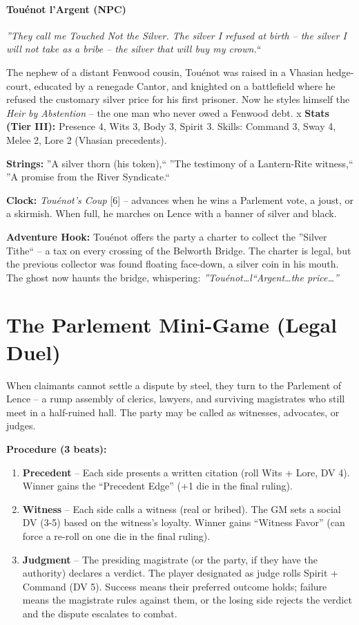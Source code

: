 \documentclass[11pt,twoside]{book}
\begin{document}
\paragraph{Touénot l'Argent (NPC)}
\textit{''They call me Touched Not the Silver. The silver I refused at birth -- the silver I will not take as a bribe -- the silver that will buy my crown.``}

The nephew of a distant Fenwood cousin, Touénot was raised in a Vhasian hedge-court, educated by a renegade Cantor, and knighted on a battlefield where he refused the customary silver price for his first prisoner. Now he styles himself the \textit{Heir by Abstention} -- the one man who never owed a Fenwood debt.
x
\textbf{Stats (Tier III):} Presence 4, Wits 3, Body 3, Spirit 3. Skills: Command 3, Sway 4, Melee 2, Lore 2 (Vhasian precedents).

\textbf{Strings:} ''A silver thorn (his token),`` ''The testimony of a Lantern-Rite witness,`` ''A promise from the River Syndicate.``

\textbf{Clock:} \textit{Touénot's Coup} [6] -- advances when he wins a Parlement vote, a joust, or a skirmish. When full, he marches on Lence with a banner of silver and black.

\textbf{Adventure Hook:} Touénot offers the party a charter to collect the ''Silver Tithe`` -- a tax on every crossing of the Belworth Bridge. The charter is legal, but the previous collector was found floating face-down, a silver coin in his mouth. The ghost now haunts the bridge, whispering: \textit{''Touénot\dots l``Argent\dots the price\dots''}

\section*{The Parlement Mini-Game (Legal Duel)}

When claimants cannot settle a dispute by steel, they turn to the Parlement of Lence -- a rump assembly of clerics, lawyers, and surviving magistrates who still meet in a half-ruined hall. The party may be called as witnesses, advocates, or judges.

\textbf{Procedure (3 beats):}

\begin{enumerate}
    \item \textbf{Precedent} -- Each side presents a written citation (roll Wits + Lore, DV 4). Winner gains the ``Precedent Edge'' (+1 die in the final ruling).
    \item \textbf{Witness} -- Each side calls a witness (real or bribed). The GM sets a social DV (3-5) based on the witness's loyalty. Winner gains ``Witness Favor'' (can force a re-roll on one die in the final ruling).
    \item \textbf{Judgment} -- The presiding magistrate (or the party, if they have the authority) declares a verdict. The player designated as judge rolls Spirit + Command (DV 5). Success means their preferred outcome holds; failure means the magistrate rules against them, or the losing side rejects the verdict and the dispute escalates to combat.
\end{enumerate}
\end{document}
